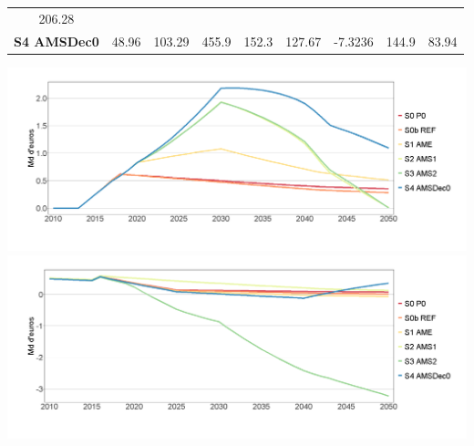 \documentclass[]{article}
\begin{document}
\begin{longtable}[]{@{}crrrrrrrr@{}}
\begin{minipage}[t]{0.13\columnwidth}
206.28\strut
\end{minipage}\tabularnewline
\begin{minipage}[t]{0.08\columnwidth}\centering\strut
\textbf{S4 AMSDec0}\strut
\end{minipage} & \begin{minipage}[t]{0.09\columnwidth}\raggedleft\strut
48.96\strut
\end{minipage} & \begin{minipage}[t]{0.06\columnwidth}\raggedleft\strut
103.29\strut
\end{minipage} & \begin{minipage}[t]{0.06\columnwidth}\raggedleft\strut
455.9\strut
\end{minipage} & \begin{minipage}[t]{0.07\columnwidth}\raggedleft\strut
152.3\strut
\end{minipage} & \begin{minipage}[t]{0.07\columnwidth}\raggedleft\strut
127.67\strut
\end{minipage} & \begin{minipage}[t]{0.05\columnwidth}\raggedleft\strut
-7.3236\strut
\end{minipage} & \begin{minipage}[t]{0.13\columnwidth}\raggedleft\strut
144.9\strut
\end{minipage} & \begin{minipage}[t]{0.13\columnwidth}\raggedleft\strut
83.94\strut
\end{minipage}\tabularnewline
\bottomrule
\end{longtable}

\includegraphics{Exemple_sortiestertiaire_files/figure-latex/Evol_Recettes_CC-1.png}
\includegraphics{Exemple_sortiestertiaire_files/figure-latex/Evol_Recettes_taxesautres-1.png}
\end{document}
